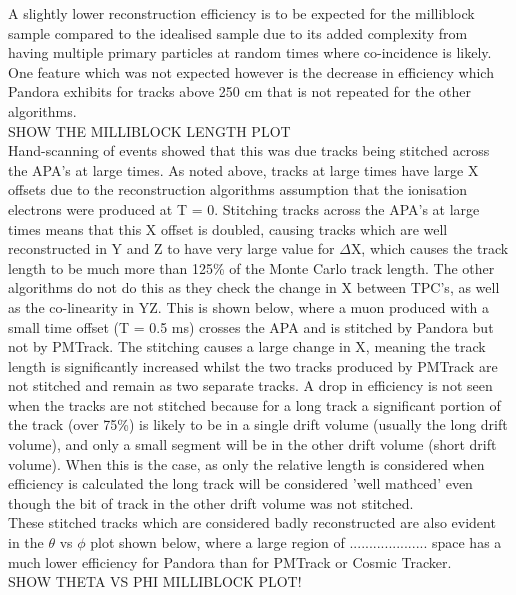 \documentclass[11pt]{report} %
\begin{document}
{A slightly lower reconstruction efficiency is to be expected for the milliblock sample compared to the idealised sample due to its added complexity from having multiple primary particles at random times where co-incidence is likely. One feature which was not expected however is the decrease in efficiency which Pandora exhibits for tracks above 250 cm that is not repeated for the other algorithms. \\

SHOW THE MILLIBLOCK LENGTH PLOT \\

Hand-scanning of events showed that this was due tracks being stitched across the APA's at large times. As noted above, tracks at large times have large X offsets due to the reconstruction algorithms assumption that the ionisation electrons were produced at T = 0. Stitching tracks across the APA's at large times means that this X offset is doubled, causing tracks which are well reconstructed in Y and Z to have very large value for $\Delta$X, which causes the track length to be much more than 125\% of the Monte Carlo track length. The other algorithms do not do this as they check the change in X between TPC's, as well as the co-linearity in YZ. This is shown below, where a muon produced with a small time offset (T = 0.5 ms) crosses the APA and is stitched by Pandora but not by PMTrack. The stitching causes a large change in X, meaning the track length is significantly increased whilst the two tracks produced by PMTrack are not stitched and remain as two separate tracks. A drop in efficiency is not seen when the tracks are not stitched because for a long track a significant portion of the track (over 75\%) is likely to be in a single drift volume (usually the long drift volume), and only a small segment will be in the other drift volume (short drift volume). When this is the case, as only the relative length is considered when efficiency is calculated the long track will be considered 'well mathced' even though the bit of track in the other drift volume was not stitched. \\

These stitched tracks which are considered badly reconstructed are also evident in the $\theta$ vs $\phi$ plot shown below, where a large region of .................... space has a much lower efficiency for Pandora than for PMTrack or Cosmic Tracker. \\

SHOW THETA VS PHI MILLIBLOCK PLOT! \\

}
\end{document}
